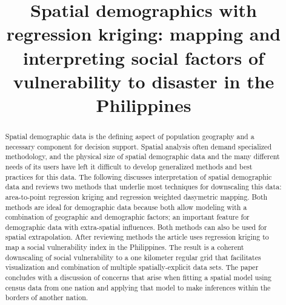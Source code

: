 \documentclass[]{interact}
\theoremstyle{plain}%
\theoremstyle{definition}
\theoremstyle{remark}
\begin{document}

\title{Spatial demographics with regression kriging: mapping and interpreting social factors of vulnerability to disaster in the Philippines}

\author{
}

\maketitle

\begin{abstract}
  Spatial demographic data is the defining aspect of population geography and a necessary component for decision support.  Spatial analysis often demand specialized methodology, and the physical size of spatial demographic data and the many different needs of its users have left it difficult to develop generalized methods and best practices for this data.  The following discusses interpretation of spatial demographic data and reviews two methods that underlie most techniques for downscaling this data: area-to-point regression kriging and regression weighted dasymetric mapping.  Both methods are ideal for demographic data because both allow modeling with a combination of geographic and demographic factors; an important feature for demographic data with extra-spatial influences.  Both methods can also be used for spatial extrapolation.  After reviewing methods the article uses regression kriging to map a social vulnerability index in the Philippines.  The result is a coherent downscaling of social vulnerability to a one kilometer regular grid that facilitates visualization and combination of multiple spatially-explicit data sets.  The paper concludes with a discussion of concerns that arise when fitting a spatial model using census data from one nation and applying that model to make inferences within the borders of another nation.
\end{abstract}

\end{document}
